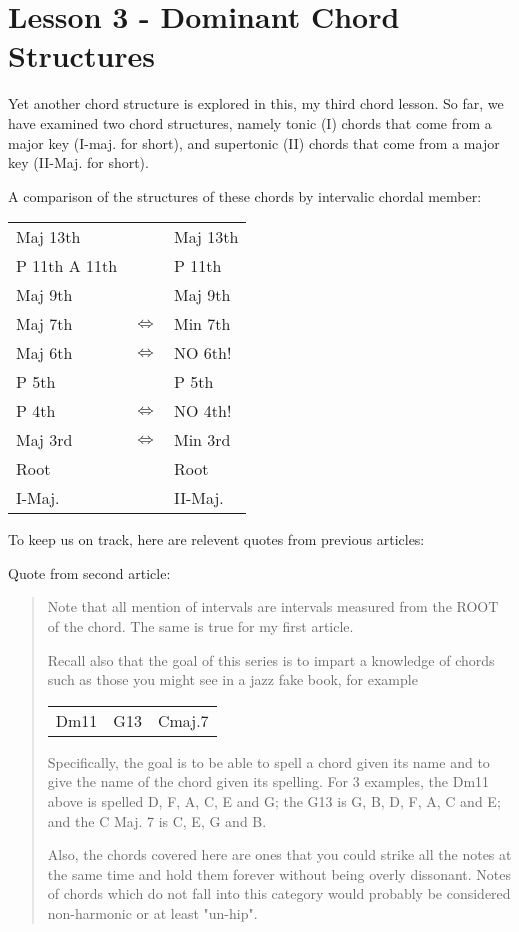 \section{Lesson 3 - Dominant Chord Structures}

Yet another chord structure is explored in this, my third chord lesson.
So far, we have examined two chord structures, namely tonic (I) chords
that come from a major key (I-maj. for short), and supertonic (II) 
chords that come from a major key (II-Maj. for short).

A comparison of the structures of these chords by intervalic chordal member:

\begin{tabular}{ | l c l | }
	\hline
	Maj 13th					&					& Maj 13th				\\
	P 11th   A 11th   & 				& P 11th					\\
	Maj 9th           & 				& Maj 9th					\\
	Maj 7th    				& $\iff$	& Min 7th					\\
	Maj 6th						& $\iff$	& NO 6th!					\\
	P 5th             & 				& P 5th						\\
	P 4th							& $\iff$	& NO 4th!					\\
	Maj 3rd						& $\iff$	& Min 3rd					\\
	Root              & 				& Root						\\
	\hline
  I-Maj.            & 				& II-Maj.					\\
  \hline
\end{tabular}

To keep us on track, here are relevent quotes from previous articles:

Quote from second article:
\begin{quote}
Note that all mention of intervals are intervals measured from the ROOT
of the chord. The same is true for my first article.

Recall also that the goal of this series is to impart a knowledge of
chords such as those you might see in a jazz fake book, for example

\begin{center}
\begin{tabular}{ c c c }
  Dm11 & G13 & Cmaj.7\\
\end{tabular}
\end{center}

Specifically, the goal is to be able to spell a chord given its name and
to give the name of the chord given its spelling. For 3 examples, the
Dm11 above is spelled D, F, A, C, E and G; the G13 is G, B, D, F, A, C
and E; and the C Maj. 7 is C, E, G and B.

Also, the chords covered here are ones that you could strike all the
notes at the same time and hold them forever without being overly
dissonant. Notes of chords which do not fall into this category would
probably be considered non-harmonic or at least "un-hip".
\end{quote}

